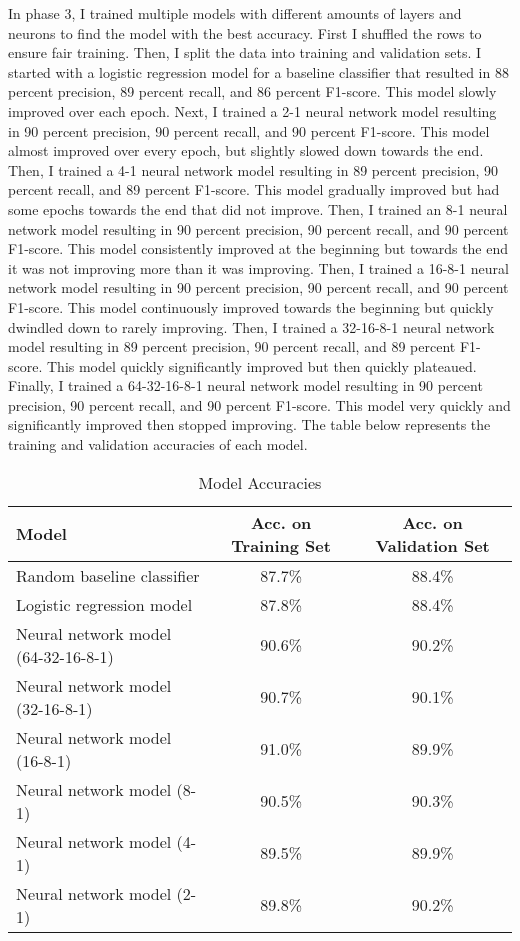 \documentclass{article}
\begin{document}
In phase 3, I trained multiple models with different amounts of layers and neurons to find the model with the best accuracy. First I shuffled the rows to ensure fair training. Then, I split the data into training and validation sets. I started with a logistic regression model for a baseline classifier that resulted in 88 percent precision, 89 percent recall, and 86 percent F1-score. This model slowly improved over each epoch. Next, I trained a 2-1 neural network model resulting in 90 percent precision, 90 percent recall, and 90 percent F1-score. This model almost improved over every epoch, but slightly slowed down towards the end. Then, I trained a 4-1 neural network model resulting in 89 percent precision, 90 percent recall, and 89 percent F1-score. This model gradually improved but had some epochs towards the end that did not improve. Then, I trained an 8-1 neural network model resulting in 90 percent precision, 90 percent recall, and 90 percent F1-score. This model consistently improved at the beginning but towards the end it was not improving more than it was improving. Then, I trained a 16-8-1 neural network model resulting in 90 percent precision, 90 percent recall, and 90 percent F1-score. This model continuously improved towards the beginning but quickly dwindled down to rarely improving. Then, I trained a 32-16-8-1 neural network model resulting in 89 percent precision, 90 percent recall, and 89 percent F1-score. This model quickly significantly improved but then quickly plateaued. Finally, I trained a 64-32-16-8-1 neural network model resulting in 90 percent precision, 90 percent recall, and 90 percent F1-score. This model very quickly and significantly improved then stopped improving. The table below represents the training and validation accuracies of each model. 

\begin{table}[H]
\centering
\begin{tabular}{|l|c|c|}
\hline
Model & Acc. on Training Set & Acc. on Validation Set \\
\hline
Random baseline classifier & 87.7\% & 88.4\% \\
Logistic regression model & 87.8\% & 88.4\% \\
Neural network model (64-32-16-8-1) & 90.6\% & 90.2\% \\
Neural network model (32-16-8-1) & 90.7\% & 90.1\% \\
Neural network model (16-8-1) & 91.0\% & 89.9\% \\
Neural network model (8-1) & 90.5\% & 90.3\% \\
Neural network model (4-1) & 89.5\% & 89.9\% \\
Neural network model (2-1) & 89.8\% & 90.2\% \\
\hline
\end{tabular}
\caption{Model Accuracies}
\label{tab:my_label}
\end{table}
\end{document}
